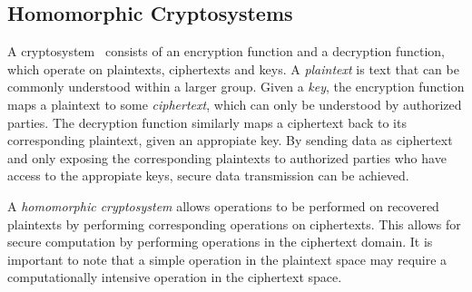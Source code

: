 \subsection{Homomorphic Cryptosystems}
A cryptosystem~\cite{bauer_cryptosystem_2005} consists of an encryption function and a decryption function, which operate on plaintexts, ciphertexts and keys. A \textit{plaintext} is text that can be commonly understood within a larger group. Given a \textit{key}, the encryption function maps a plaintext to some \textit{ciphertext}, which can only be understood by authorized parties. The decryption function similarly maps a ciphertext back to its corresponding plaintext, given an appropiate key. By sending data as ciphertext and only exposing the corresponding plaintexts to authorized parties who have access to the appropiate keys, secure data transmission can be achieved.

A \textit{homomorphic cryptosystem} allows operations to be performed on recovered plaintexts by performing corresponding operations on ciphertexts. This allows for secure computation by performing operations in the ciphertext domain. It is important to note that a simple operation in the plaintext space may require a computationally intensive operation in the ciphertext space.


